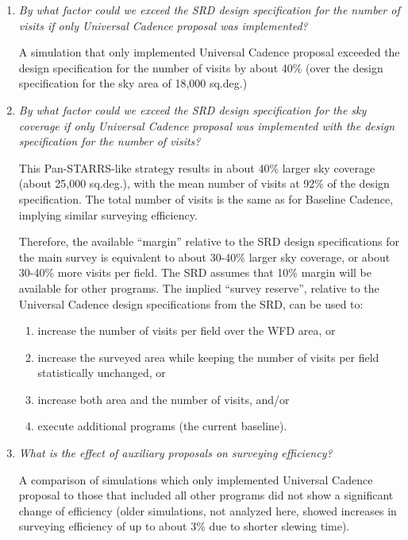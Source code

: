 \begin{enumerate}

\item {\it By what factor could we exceed the SRD design specification
for the number of visits if only Universal Cadence proposal was
implemented?}

A simulation that only implemented Universal Cadence proposal exceeded
the design specification for the number of visits by about 40\% (over
the design specification for the sky area of 18,000 sq.deg.)

\item {\it By what factor could we exceed the SRD design specification
for the sky coverage if only Universal Cadence proposal was
implemented with the design specification for the number of visits?}

This Pan-STARRS-like strategy results in about 40\% larger sky
coverage (about 25,000 sq.deg.), with the mean number of visits at
92\% of the design specification. The total number of visits is the
same as for Baseline Cadence, implying similar surveying efficiency.

Therefore, the available ``margin'' relative to the SRD design specifications
for the main survey is equivalent to about 30-40\% larger sky coverage, or
about 30-40\% more visits per field. The SRD assumes that 10\% margin
will be available for other programs. The implied ``survey reserve'',
relative to the Universal Cadence design specifications from the SRD, can
be used to:
  \begin{enumerate}
  \item increase the number of visits per field over the WFD area,  or
  \item increase the surveyed area while keeping the number of visits
  per field statistically unchanged, or
  \item increase both area and the number of visits, and/or
  \item execute additional programs (the current baseline).
  \end{enumerate}

\item {\it What is the effect of auxiliary proposals on surveying
efficiency?}

A comparison of simulations which only implemented Universal Cadence
proposal to those that included all other programs did not show a
significant change of efficiency (older simulations, not analyzed
here, showed increases in surveying efficiency of up to about 3\% due
to shorter slewing time).



\end{enumerate}
